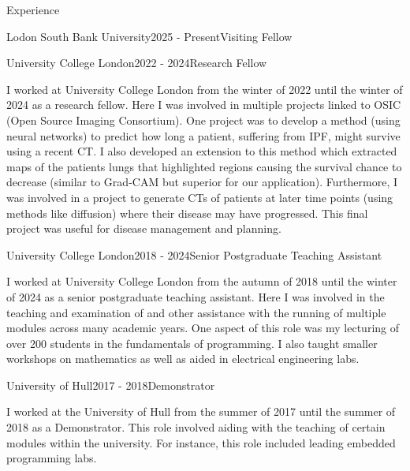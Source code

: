 \documentclass{cv}
\begin{document}
    \begin{rSection}{Experience}
        \item \begin{rSubsection}{Lodon South Bank University}{2025 - Present}{Visiting Fellow}{}
            \item 
        \end{rSubsection}
        
        \item \begin{rSubsection}{University College London}{2022 - 2024}{Research Fellow}{}
            \item I worked at University College London from the winter of 2022 until the winter of 2024 as a research fellow. Here I was involved in multiple projects linked to OSIC (Open Source Imaging Consortium). One project was to develop a method (using neural networks) to predict how long a patient, suffering from IPF, might survive using a recent CT. I also developed an extension to this method which extracted maps of the patients lungs that highlighted regions causing the survival chance to decrease (similar to Grad-CAM but superior for our application). Furthermore, I was involved in a project to generate CTs of patients at later time points (using methods like diffusion) where their disease may have progressed. This final project was useful for disease management and planning.
        \end{rSubsection}
        
        \item \begin{rSubsection}{University College London}{2018 - 2024}{Senior Postgraduate Teaching Assistant}{}
            \item I worked at University College London from the autumn of 2018 until the winter of 2024 as a senior postgraduate teaching assistant. Here I was involved in the teaching and examination of and other assistance with the running of multiple modules across many academic years. One aspect of this role was my lecturing of over 200 students in the fundamentals of programming. I also taught smaller workshops on mathematics as well as aided in electrical engineering labs.
        \end{rSubsection}
        
        \item \begin{rSubsection}{University of Hull}{2017 - 2018}{Demonstrator}{}
            \item I worked at the University of Hull from the summer of 2017 until the summer of 2018 as a Demonstrator. This role involved aiding with the teaching of certain modules within the university. For instance, this role included leading embedded programming labs.
        \end{rSubsection}
        

\end{rSection}
\end{document}

